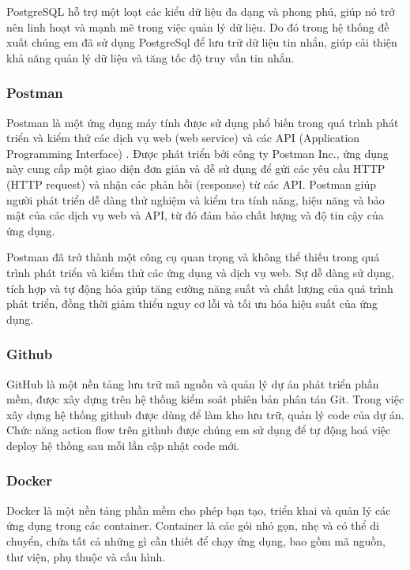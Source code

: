 PostgreSQL hỗ trợ một loạt các kiểu dữ liệu đa dạng và phong phú, giúp nó trở nên linh hoạt và mạnh mẽ trong việc quản lý dữ liệu. Do đó trong hệ thống đề xuất chúng em đã sử dụng PostgreSql để lưu trữ dữ liệu tin nhắn, giúp cải thiện khả năng quản lý dữ liệu và tăng tốc độ truy vấn tin nhắn.
\subsubsection{Postman}
\mbox{}

Postman là một ứng dụng máy tính được sử dụng phổ biến trong quá trình phát triển và kiểm thử các dịch vụ web (web service) và các API (Application Programming Interface) \cite{postman_1}. Được phát triển bởi công ty Postman Inc., ứng dụng này cung cấp một giao diện đơn giản và dễ sử dụng để gửi các yêu cầu HTTP (HTTP request) và nhận các phản hồi (response) từ các API. Postman giúp người phát triển dễ dàng thử nghiệm và kiểm tra tính năng, hiệu năng và bảo mật của các dịch vụ web và API, từ đó đảm bảo chất lượng và độ tin cậy của ứng dụng.

Postman đã trở thành một công cụ quan trọng và không thể thiếu trong quá trình phát triển và kiểm thử các ứng dụng và dịch vụ web. Sự dễ dàng sử dụng, tích hợp và tự động hóa giúp tăng cường năng suất và chất lượng của quá trình phát triển, đồng thời giảm thiểu nguy cơ lỗi và tối ưu hóa hiệu suất của ứng dụng.

\subsubsection{Github}
\mbox{}

GitHub là một nền tảng lưu trữ mã nguồn và quản lý dự án phát triển phần mềm, được xây dựng trên hệ thống kiểm soát phiên bản phân tán Git. Trong việc xây dựng hệ thống github được dùng để làm kho lưu trữ, quản lý code của dự án. Chức năng action flow trên github được chúng em sử dụng để tự động hoá việc deploy hệ thống sau mỗi lần cập nhật code mới.

\subsubsection{Docker}
\mbox{}

Docker là một nền tảng phần mềm cho phép bạn tạo, triển khai và quản lý các ứng dụng trong các container. Container là các gói nhỏ gọn, nhẹ và có thể di chuyển, chứa tất cả những gì cần thiết để chạy ứng dụng, bao gồm mã nguồn, thư viện, phụ thuộc và cấu hình.


